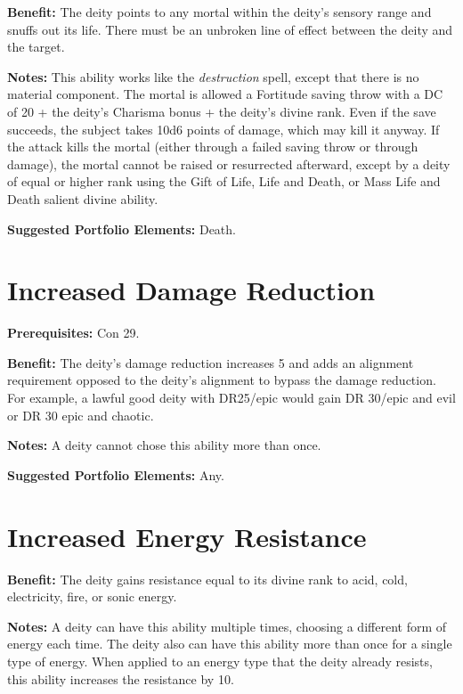 \documentclass{article}
\begin{document}
\textbf{Benefit:} The deity points to any mortal within the deity's sensory range 
and snuffs out its life. There must be an unbroken line of effect between the deity 
and the target.

\textbf{Notes:} This ability works like the \textit{destruction }spell, except 
that there is no material component. The mortal is allowed a Fortitude saving throw 
with a DC of 20 + the deity's Charisma bonus + the deity's divine rank. Even if 
the save succeeds, the subject takes 10d6 points of damage, which may kill it anyway. 
If the attack kills the mortal (either through a failed saving throw or through 
damage), the mortal cannot be raised or resurrected afterward, except by a deity 
of equal or higher rank using the Gift of Life, Life and Death, or Mass Life and 
Death salient divine ability.

\textbf{Suggested Portfolio Elements:} Death.

\vspace{12pt}
\section*{Increased Damage Reduction}

\textbf{Prerequisites:} Con 29.

\textbf{Benefit:} The deity's damage reduction increases 5 and adds an alignment 
requirement opposed to the deity's alignment to bypass the damage reduction. For 
example, a lawful good deity with DR25/epic would gain DR 30/epic and evil or DR 
30 epic and chaotic. 

\textbf{Notes:} A deity cannot chose this ability more than once.

\textbf{Suggested Portfolio Elements:} Any.

\vspace{12pt}
\section*{Increased Energy Resistance}

\textbf{Benefit:} The deity gains resistance equal to its divine rank to acid, 
cold, electricity, fire, or sonic energy. 

\textbf{Notes:} A deity can have this ability multiple times, choosing a different 
form of energy each time. The deity also can have this ability more than once for 
a single type of energy. When applied to an energy type that the deity already 
resists, this ability increases the resistance by 10. 
\end{document}
